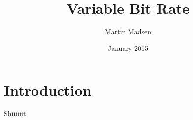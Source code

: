 \documentclass{article}
\title{Variable Bit Rate}
\author{Martin Madsen}
\date{January 2015}
\begin{document}
\maketitle

\section{Introduction}
Shiiiiiit
\end{document}
